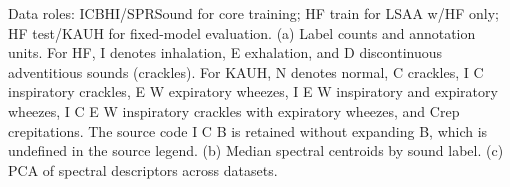 \caption{Data roles: ICBHI/SPRSound for core training; HF train for LSAA w/HF only; HF test/KAUH for fixed-model evaluation.
(a) Label counts and annotation units. For HF, I denotes inhalation, E exhalation, and D discontinuous adventitious sounds (crackles). For KAUH, N denotes normal, C crackles, I C inspiratory crackles, E W expiratory wheezes, I E W inspiratory and expiratory wheezes, I C E W inspiratory crackles with expiratory wheezes, and Crep crepitations. The source code I C B is retained without expanding B, which is undefined in the source legend.
(b) Median spectral centroids by sound label.
(c) PCA of spectral descriptors across datasets.}

